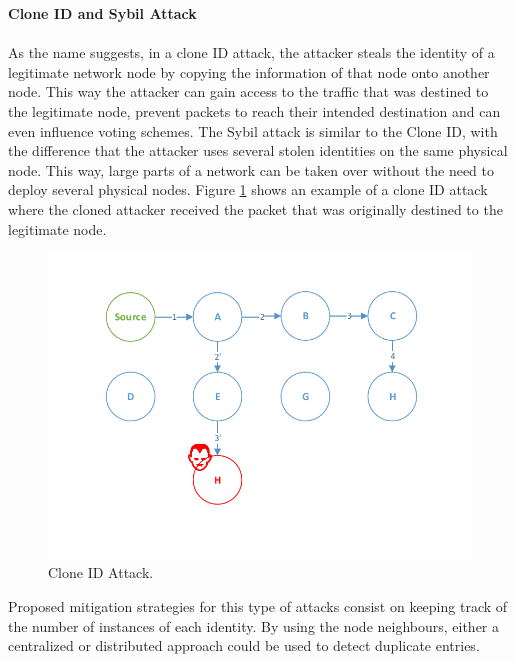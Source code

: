 \documentclass{sig-alternate-05-2015}
\begin{document}
\textbf{Clone ID and Sybil Attack}\\\\
As the name suggests, in a clone ID attack, the attacker steals the identity of a legitimate network node by copying the information of that node onto another node. This way the attacker can gain access to the traffic that was destined to the legitimate node, prevent packets to reach their intended destination and can even influence voting schemes. The Sybil attack is similar to the Clone ID, with the difference that the attacker uses several stolen identities on the same physical node. This way, large parts of a network can be taken over without the need to deploy several physical nodes. Figure \ref{fig:clone_attack} shows an example of a clone ID attack where the cloned attacker received the packet that was originally destined to the legitimate node.

\begin{figure}[h]
  \centering
  \includegraphics[width=1\linewidth]{figures/Clone_attack.pdf}
  \caption{Clone ID Attack.}
  \label{fig:clone_attack}
\end{figure} 

Proposed mitigation strategies for this type of attacks consist on keeping track of the number of instances of each identity. By using the node neighbours, either a centralized or distributed approach could be used to detect duplicate entries.
\end{document}
